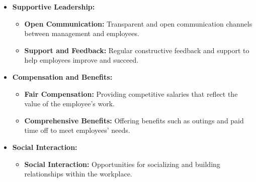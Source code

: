 \begin{itemize}
\item \textbf{Supportive Leadership:}
\begin{itemize}
    \item \textbf{Open Communication:} Transparent and open communication channels between management and employees.
    \item \textbf{Support and Feedback:} Regular constructive feedback and support to help employees improve and succeed.
\end{itemize}

\item \textbf{Compensation and Benefits:}
\begin{itemize}
    \item \textbf{Fair Compensation:} Providing competitive salaries that reflect the value of the employee's work.
    \item \textbf{Comprehensive Benefits:} Offering benefits such as outings and paid time off to meet employees' needs.
\end{itemize}

\item \textbf{Social Interaction:}
\begin{itemize}
    \item \textbf{Social Interaction:} Opportunities for socializing and building relationships within the workplace.
\end{itemize}
\end{itemize}

